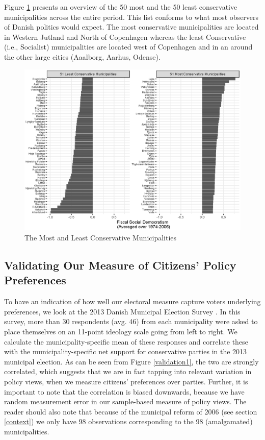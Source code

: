 \documentclass[a4paper,12pt]{article}
\begin{document}
Figure \ref{mostleast} presents an overview of the 50 most and the 50 least conservative municipalities across the entire period. This list conforms to what most observers of Danish politics would expect. The most conservative municipalities are located in Western Jutland and North of Copenhagen whereas the least Conservative (i.e., Socialist) municipalities are located west of Copenhagen and in an around the other large cities (Aaalborg, Aarhus, Odense). 

\begin{figure}
	\centering
	\includegraphics[width=1\textwidth]{conservatism_24092018.eps}
	\caption{The Most and Least Conservative Municipalities} \label{mostleast}
\end{figure}

\clearpage


\subsection{Validating Our Measure of Citizens' Policy Preferences} \label{validation}

\setcounter{table}{0}
\setcounter{figure}{0}


To have an indication of how well our electoral measure capture voters underlying preferences, we look at the 2013 Danish Municipal Election Survey \cite{elklit2017kv13}. In this survey, more than 30 respondents (avg. 46) from each municipality were asked to place themselves on an 11-point ideology scale going from left to right. We calculate the municipality-specific mean of these responses and correlate these with the municipality-specific net support for conservative parties in the 2013 municipal election.  As can be seen from Figure \ref{validation1}, the two are strongly correlated, which suggests that we are in fact tapping into relevant variation in policy views, when we measure citizens' preferences over parties. Further, it is important to note that the correlation is biased downwards, because we have random measurement error in our sample-based measure of policy views. The reader should also note that because of the municipal reform of 2006 (see section \ref{context})  we only have 98 observations corresponding to the 98 (amalgamated) municipalities.
\end{document}
